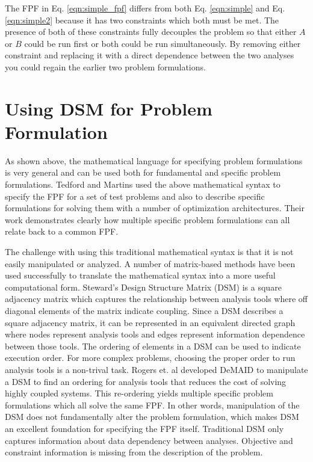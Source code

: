     The FPF in Eq. \ref{eqn:simple_fpf} differs from both Eq. \ref{eqn:simple} and Eq. \ref{eqn:simple2} because it has 
    two constraints which both must be met. The presence of both of these constraints fully decouples the problem so that 
    either $A$ or $B$ could be run first or both could be run simultaneously. By removing either constraint and replacing 
    it with a direct dependence between the two analyses you could regain the earlier two problem formulations.     


\section{Using DSM for Problem Formulation}

    As shown above, the mathematical language for specifying problem formulations is very general and can be used both for 
    fundamental and specific problem formulations. Tedford and Martins used the above mathematical syntax to specify the 
    FPF for a set of test problems and also to describe specific formulations for solving them with a 
    number of optimization architectures\cite{Tedford2009}. Their work demonstrates clearly how multiple specific 
    problem formulations can all relate back to a common FPF. 
    
    The challenge with using this traditional mathematical syntax is that it is not easily manipulated or analyzed. 
    A number of matrix-based methods have been used successfully to translate the mathematical syntax into a more useful computational form. 
    Steward's Design Structure Matrix (DSM) is a square adjacency matrix which captures the relationship between analysis tools where off 
    diagonal elements of the matrix indicate coupling\cite{Steward1981}. Since a DSM describes a square adjacency matrix, 
    it can be represented in an equivalent directed graph where nodes represent analysis tools and 
    edges represent information dependence between those tools. The ordering of elements in a DSM can be used to indicate 
    execution order.  For more complex problems, choosing the proper order to run analysis tools is a non-trival task. 
    Rogers et. al developed DeMAID to manipulate a DSM to find an ordering for analysis tools that 
    reduces the cost of solving highly coupled systems\cite{Rogers1996}. This re-ordering yields multiple specific problem 
    formulations which all solve the same FPF. In other words, manipulation of the DSM does not fundamentally alter
    the problem formulation, which makes DSM an excellent foundation for specifying the FPF itself. Traditional DSM only captures information 
    about data dependency between analyses. Objective and constraint information is missing from the description of the problem. 
    

